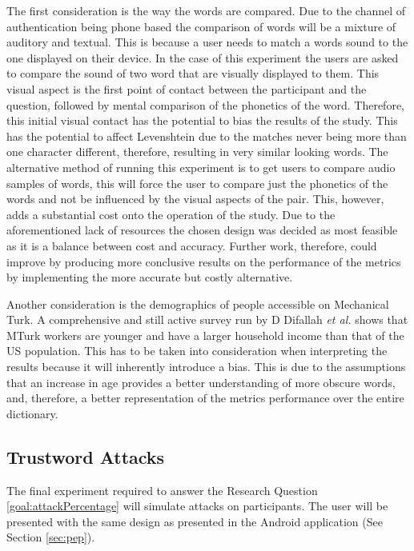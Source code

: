 The first consideration is the way the words are compared. Due to the channel of authentication being phone based the comparison of words will be a mixture of auditory and textual. This is because a user needs to match a words sound to the one displayed on their device. In the case of this experiment the users are asked to compare the sound of two word that are visually displayed to them. This visual aspect is the first point of contact between the participant and the question, followed by mental comparison of the phonetics of the word. Therefore, this initial visual contact has the potential to bias the results of the study. This has the potential to affect Levenshtein due to the matches never being more than one character different, therefore, resulting in very similar looking words. The alternative method of running this experiment is to get users to compare audio samples of words, this will force the user to compare just the phonetics of the words and not be influenced by the visual aspects of the pair. This, however, adds a substantial cost onto the operation of the study. Due to the aforementioned lack of resources the chosen design was decided as most feasible as it is a balance between cost and accuracy. Further work, therefore, could improve by producing more conclusive results on the performance of the metrics by implementing the more accurate but costly alternative.

Another consideration is the demographics of people accessible on Mechanical Turk. A comprehensive and still active survey run by D Difallah \textit{et al.} \cite{difallah2018demographics} shows that MTurk workers are younger and have a larger household income than that of the US population. This has to be taken into consideration when interpreting the results because it will inherently introduce a bias. This is due to the assumptions that an increase in age provides a better understanding of more obscure words, and, therefore, a better representation of the metrics performance over the entire dictionary.

\subsection{Trustword Attacks}

The final experiment required to answer the Research Question \ref{goal:attackPercentage} will simulate attacks on participants. The user will be presented with the same design as presented in the \pep Android application (See Section \ref{sec:pep}).

